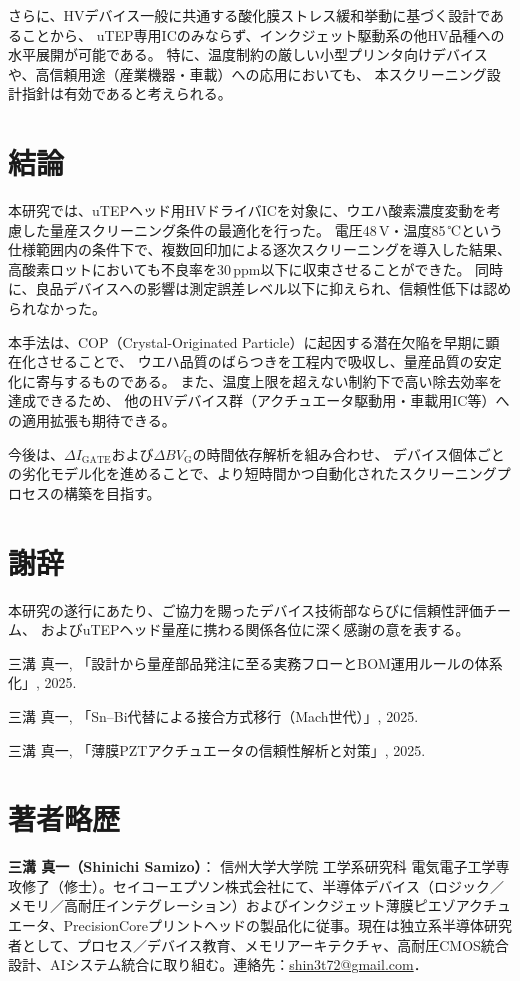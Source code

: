 \documentclass[twocolumn]{ieeetran}
\begin{document}
さらに、HVデバイス一般に共通する酸化膜ストレス緩和挙動に基づく設計であることから、
uTEP専用ICのみならず、インクジェット駆動系の他HV品種への水平展開が可能である。
特に、温度制約の厳しい小型プリンタ向けデバイスや、高信頼用途（産業機器・車載）への応用においても、
本スクリーニング設計指針は有効であると考えられる。

\section{結論}
本研究では、uTEPヘッド用HVドライバICを対象に、ウエハ酸素濃度変動を考慮した量産スクリーニング条件の最適化を行った。
電圧48\,V・温度85\,℃という仕様範囲内の条件下で、複数回印加による逐次スクリーニングを導入した結果、
高酸素ロットにおいても不良率を30\,ppm以下に収束させることができた。
同時に、良品デバイスへの影響は測定誤差レベル以下に抑えられ、信頼性低下は認められなかった。

本手法は、COP（Crystal-Originated Particle）に起因する潜在欠陥を早期に顕在化させることで、
ウエハ品質のばらつきを工程内で吸収し、量産品質の安定化に寄与するものである。
また、温度上限を超えない制約下で高い除去効率を達成できるため、
他のHVデバイス群（アクチュエータ駆動用・車載用IC等）への適用拡張も期待できる。

今後は、$\Delta I_\mathrm{GATE}$および$\Delta BV_\mathrm{G}$の時間依存解析を組み合わせ、
デバイス個体ごとの劣化モデル化を進めることで、より短時間かつ自動化されたスクリーニングプロセスの構築を目指す。

\section*{謝辞}
本研究の遂行にあたり、ご協力を賜ったデバイス技術部ならびに信頼性評価チーム、
およびuTEPヘッド量産に携わる関係各位に深く感謝の意を表する。

\begin{thebibliography}{99}

三溝 真一, 「設計から量産部品発注に至る実務フローとBOM運用ルールの体系化」, 2025.

三溝 真一, 「Sn–Bi代替による接合方式移行（Mach世代）」, 2025.

三溝 真一, 「薄膜PZTアクチュエータの信頼性解析と対策」, 2025.

\end{thebibliography}

\section*{著者略歴}
\noindent\textbf{三溝 真一（Shinichi Samizo）}：
信州大学大学院 工学系研究科 電気電子工学専攻修了（修士）。セイコーエプソン株式会社にて、半導体デバイス（ロジック／メモリ／高耐圧インテグレーション）およびインクジェット薄膜ピエゾアクチュエータ、PrecisionCoreプリントヘッドの製品化に従事。現在は独立系半導体研究者として、プロセス／デバイス教育、メモリアーキテクチャ、高耐圧CMOS統合設計、AIシステム統合に取り組む。連絡先：\href{mailto:shin3t72@gmail.com}{shin3t72@gmail.com}．
\end{document}
